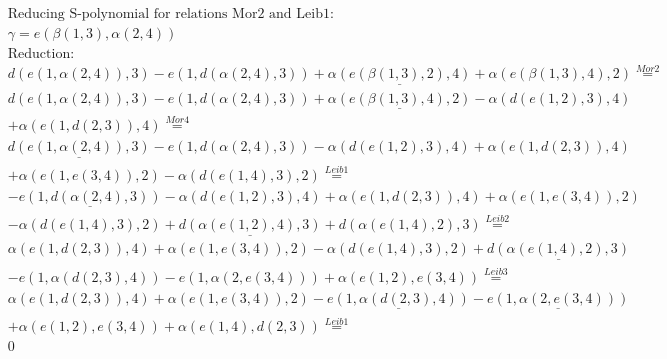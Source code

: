 \documentclass[11pt]{amsart}
\begin{document}
\begin{align*} 
& \text{Reducing S-polynomial for relations Mor2 and Leib1:} \\ 
& \gamma = e(\beta(1,3),\alpha(2,4)) \\ 
& \text{Reduction}: \\&d(e(1,\alpha(2,4)),3) - e(1,d(\alpha(2,4),3)) + \underline{\alpha(e(\beta(1,3),2),4)} + \alpha(e(\beta(1,3),4),2) \stackrel{ Mor2 }{=}  \\ 
&d(e(1,\alpha(2,4)),3) - e(1,d(\alpha(2,4),3)) + \underline{\alpha(e(\beta(1,3),4),2)} - \alpha(d(e(1,2),3),4)\\ 
 &  + \alpha(e(1,d(2,3)),4) \stackrel{ Mor4 }{=}  \\ 
&\underline{d(e(1,\alpha(2,4)),3)} - e(1,d(\alpha(2,4),3)) - \alpha(d(e(1,2),3),4) + \alpha(e(1,d(2,3)),4)\\ 
 &  + \alpha(e(1,e(3,4)),2) - \alpha(d(e(1,4),3),2) \stackrel{ Leib1 }{=}  \\ 
& - \underline{e(1,d(\alpha(2,4),3))} - \alpha(d(e(1,2),3),4) + \alpha(e(1,d(2,3)),4) + \alpha(e(1,e(3,4)),2)\\ 
 &  - \alpha(d(e(1,4),3),2) + \underline{d(\alpha(e(1,2),4),3)} + d(\alpha(e(1,4),2),3) \stackrel{ Leib2 }{=}  \\ 
&\alpha(e(1,d(2,3)),4) + \alpha(e(1,e(3,4)),2) - \alpha(d(e(1,4),3),2) + \underline{d(\alpha(e(1,4),2),3)}\\ 
 &  - e(1,\alpha(d(2,3),4)) - e(1,\alpha(2,e(3,4))) + \alpha(e(1,2),e(3,4)) \stackrel{ Leib3 }{=}  \\ 
&\alpha(e(1,d(2,3)),4) + \alpha(e(1,e(3,4)),2) - \underline{e(1,\alpha(d(2,3),4))} - \underline{e(1,\alpha(2,e(3,4)))}\\ 
 &  + \alpha(e(1,2),e(3,4)) + \alpha(e(1,4),d(2,3)) \stackrel{ Leib1 }{=}  \\ 
&0\\ 
\end{align*} 
 
\end{document}
